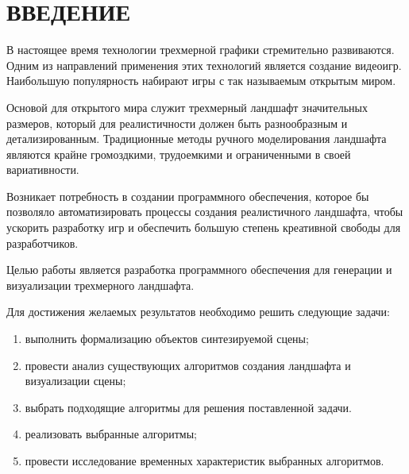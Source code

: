 \chapter*{ВВЕДЕНИЕ}

В настоящее время технологии трехмерной графики стремительно развиваются. Одним из направлений применения этих технологий является создание видеоигр. Наибольшую популярность набирают игры с так называемым открытым миром.

Основой для открытого мира служит трехмерный ландшафт значительных размеров, который для реалистичности должен быть разнообразным и детализированным. Традиционные методы ручного моделирования ландшафта являются крайне громоздкими, трудоемкими и ограниченными в своей вариативности. 

Возникает потребность в создании программного обеспечения, которое бы позволяло автоматизировать процессы создания реалистичного ландшафта, чтобы ускорить разработку игр и обеспечить большую степень креативной свободы для разработчиков.

Целью работы является разработка программного обеспечения для генерации и визуализации трехмерного ландшафта.

Для достижения желаемых результатов необходимо решить следующие задачи: 

\begin{enumerate}[label={\arabic*)}]
	\item выполнить формализацию объектов синтезируемой сцены;
	\item провести анализ существующих алгоритмов создания ландшафта и визуализации сцены;
	\item выбрать подходящие алгоритмы для решения поставленной задачи.
	\item реализовать выбранные алгоритмы;
	\item провести исследование временных характеристик выбранных алгоритмов.
\end{enumerate}

